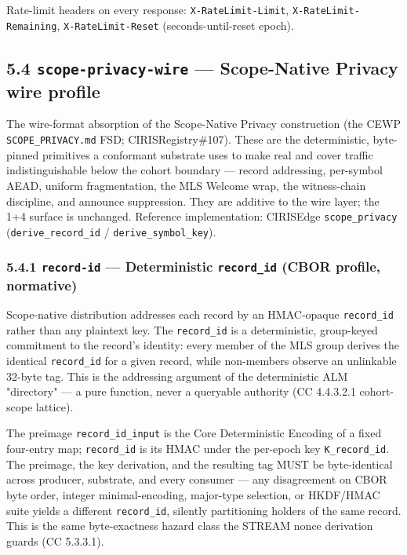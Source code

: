 \documentclass[11pt]{article}
\begin{document}
Rate-limit headers on every response: \texttt{X-RateLimit-Limit}, \texttt{X-RateLimit-Remaining}, \texttt{X-RateLimit-Reset} (seconds-until-reset epoch).


\subsection*{5.4 \texttt{scope-privacy-wire} — Scope-Native Privacy wire profile}


The wire-format absorption of the Scope-Native Privacy construction (the CEWP \texttt{SCOPE\_PRIVACY.md} FSD; CIRISRegistry\#107). These are the deterministic, byte-pinned primitives a conformant substrate uses to make real and cover traffic indistinguishable below the cohort boundary — record addressing, per-symbol AEAD, uniform fragmentation, the MLS Welcome wrap, the witness-chain discipline, and announce suppression. They are additive to the wire layer; the 1+4 surface is unchanged. Reference implementation: CIRISEdge \texttt{scope\_privacy} (\texttt{derive\_record\_id} / \texttt{derive\_symbol\_key}).


\subsubsection*{5.4.1 \texttt{record-id} — Deterministic \texttt{record\_id} (CBOR profile, normative)}


Scope-native distribution addresses each record by an HMAC-opaque \texttt{record\_id} rather than any plaintext key. The \texttt{record\_id} is a deterministic, group-keyed commitment to the record's identity: every member of the MLS group derives the identical \texttt{record\_id} for a given record, while non-members observe an unlinkable 32-byte tag. This is the addressing argument of the deterministic ALM "directory" — a pure function, never a queryable authority (CC 4.4.3.2.1 cohort-scope lattice).


The preimage \texttt{record\_id\_input} is the Core Deterministic Encoding of a fixed four-entry map; \texttt{record\_id} is its HMAC under the per-epoch key \texttt{K\_record\_id}. The preimage, the key derivation, and the resulting tag MUST be byte-identical across producer, substrate, and every consumer — any disagreement on CBOR byte order, integer minimal-encoding, major-type selection, or HKDF/HMAC suite yields a different \texttt{record\_id}, silently partitioning holders of the same record. This is the same byte-exactness hazard class the STREAM nonce derivation guards (CC 5.3.3.1).
\end{document}
